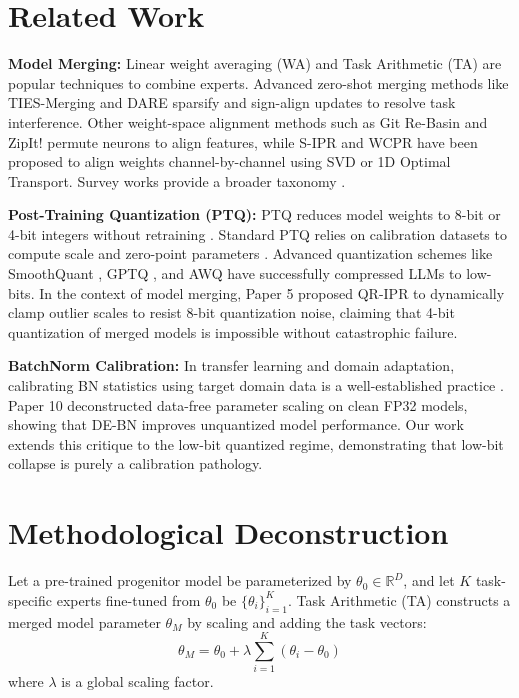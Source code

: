 \documentclass{article}
\theoremstyle{plain}
\theoremstyle{definition}
\theoremstyle{remark}
\begin{document}
\section{Related Work}
\label{sec:related}

\textbf{Model Merging:} Linear weight averaging (WA) and Task Arithmetic (TA) \cite{ilharco2022editing} are popular techniques to combine experts. Advanced zero-shot merging methods like TIES-Merging \cite{yadav2023ties} and DARE \cite{yu2024language} sparsify and sign-align updates to resolve task interference. Other weight-space alignment methods such as Git Re-Basin \cite{ainsworth2022git} and ZipIt! \cite{stoica2023zipit} permute neurons to align features, while S-IPR \cite{paper5} and WCPR \cite{paper9} have been proposed to align weights channel-by-channel using SVD or 1D Optimal Transport. Survey works provide a broader taxonomy \cite{daheim2024model}.

\textbf{Post-Training Quantization (PTQ):} PTQ reduces model weights to 8-bit or 4-bit integers without retraining \cite{gholami2021survey, nagel2021white}. Standard PTQ relies on calibration datasets to compute scale and zero-point parameters \cite{nagel2019data, nagel2020upward, li2021brecq}. Advanced quantization schemes like SmoothQuant \cite{xiao2023smoothquant}, GPTQ \cite{frantar2022gptq}, and AWQ \cite{lin2023awq} have successfully compressed LLMs to low-bits. In the context of model merging, Paper 5 \cite{paper5} proposed QR-IPR to dynamically clamp outlier scales to resist 8-bit quantization noise, claiming that 4-bit quantization of merged models is impossible without catastrophic failure.

\textbf{BatchNorm Calibration:} In transfer learning and domain adaptation, calibrating BN statistics using target domain data is a well-established practice \cite{li2016adaptive, nado2020evaluating, schneider2020improving}. Paper 10 \cite{paper10} deconstructed data-free parameter scaling on clean FP32 models, showing that DE-BN improves unquantized model performance. Our work extends this critique to the low-bit quantized regime, demonstrating that low-bit collapse is purely a calibration pathology.

\section{Methodological Deconstruction}
\label{sec:deconstruction}

Let a pre-trained progenitor model be parameterized by $\theta_0 \in \mathbb{R}^D$, and let $K$ task-specific experts fine-tuned from $\theta_0$ be $\{\theta_i\}_{i=1}^K$. Task Arithmetic (TA) constructs a merged model parameter $\theta_M$ by scaling and adding the task vectors:
\begin{equation}
    \theta_M = \theta_0 + \lambda \sum_{i=1}^K (\theta_i - \theta_0)
\end{equation}
where $\lambda$ is a global scaling factor.
\end{document}
